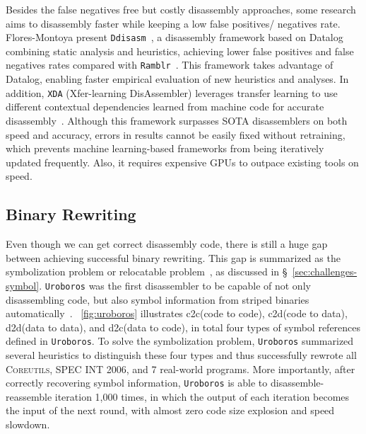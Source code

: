 Besides the false negatives free but costly disassembly approaches, some 
research aims to disassembly faster while keeping a low false positives/
negatives rate. Flores-Montoya \etal present \texttt{Ddisasm}~\cite
{flores2020datalog}, a disassembly framework based on Datalog combining static 
analysis and heuristics, achieving lower false positives and false negatives 
rates compared with \texttt{Ramblr}~\cite{wang2017ramblr}. This framework takes 
advantage of Datalog, enabling faster empirical evaluation of new heuristics 
and analyses.
In addition, \texttt{XDA} (Xfer-learning DisAssembler) leverages transfer 
learning to use different contextual dependencies learned from machine code for 
accurate disassembly~\cite{pei2020xda}. Although this framework surpasses SOTA 
disassemblers on both speed and accuracy, errors in results cannot be easily 
fixed without retraining, which prevents machine learning-based frameworks from 
being iteratively updated frequently. Also, it requires expensive GPUs to 
outpace existing tools on speed.

\subsection{Binary Rewriting} \label{sec:existing-symbolization}
Even though we can get correct disassembly code, there is still a huge gap 
between achieving successful binary rewriting. This gap is summarized as the 
symbolization problem or relocatable problem~\cite{wang2015reassembleable,
wang2017ramblr}, as discussed in \S~\ref{sec:challenges-symbol}. \texttt
{Uroboros} was the first disassembler to be capable of not only disassembling 
code, but also symbol information from striped binaries automatically~\cite
{wang2015reassembleable}. \F~\ref{fig:uroboros} illustrates c2c(code to code), 
c2d(code to data), d2d(data to data), and d2c(data to code), in total four 
types of symbol references defined in \texttt{Uroboros}. To solve the 
symbolization problem, \texttt{Uroboros} summarized several heuristics to 
distinguish these four types and thus successfully rewrote all \textsc
{Coreutils}, \textsc{SPEC INT 2006}, and 7 real-world programs. More 
importantly, after correctly recovering symbol information, \texttt{Uroboros} 
is able to disassemble-reassemble iteration 1,000 times, in which the output of 
each iteration becomes the input of the next round, with almost zero code size 
explosion and speed slowdown.

